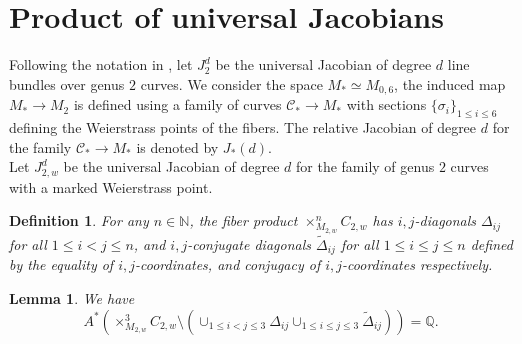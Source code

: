 \documentclass[11pt]{amsart}
\newtheorem{definition}{Definition}[section]
\numberwithin{theorem}{section}
\newtheorem{lemma}{Lemma}
\numberwithin{lemma}{section}
\theoremstyle{definition}
\newcommand{\ri}{\rightarrow}
\newcommand{\Q}{\mathbb{Q}}
\newcommand{\C}{\mathscr{C}}
\begin{document}
\section{Product of universal Jacobians}\label{sec:jxj}
Following the notation in \cite{larson-24,shubham-r2}, let $J^d_2$ be the universal Jacobian of degree $d$ line bundles over genus $2$ curves. 
We consider the space $M_*\simeq M_{0,6}$, the induced map $M_*\ri M_2$ is defined using a family of curves $\C_*\ri M_*$ with sections $\{\sigma_i\}_{1\leq i\leq 6}$ defining the Weierstrass points of the fibers.
The relative Jacobian of degree $d$ for the family $\C_*\ri M_*$ is denoted by $J_*(d)$.\\
Let $J^d_{2,w}$ be the universal Jacobian of degree $d$ for the family of genus $2$ curves with a marked Weierstrass point.
\begin{definition}
	For any $n\in \mathbb{N}$, the fiber product $\times_{M_{2,w}}^nC_{2,w}$ has $i,j$-diagonals $\Delta_{ij}$ for all $1\leq i<j\leq n$, and $i,j$-conjugate diagonals $\tilde{\Delta}_{ij}$ for all $1\leq i\leq j\leq n$ defined by the equality of $i,j$-coordinates, and conjugacy of $i,j$-coordinates respectively. 
\end{definition}
\begin{lemma}\label{lemw:cxj}
	We have 
	$$A^*(\times_{M_{2,w}}^3C_{2,w}\setminus (\cup_{1\leq i<j\leq 3}\Delta_{ij}\cup_{1\leq i\leq j\leq 3}\tilde{\Delta}_{ij})) = \Q.$$
\end{lemma}
\end{document}
